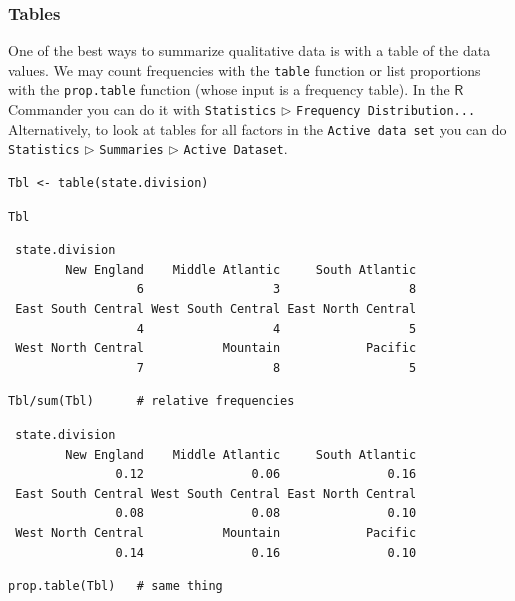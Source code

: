 \documentclass[captions=tableheading]{scrbook}
\begin{document}
\subsubsection{Tables}
\label{sec-3-1-4-1}
\label{par:Tables}


One of the best ways to summarize qualitative data is with a table of the data values. We may count frequencies with the \texttt{table} function or list proportions with the \texttt{prop.table} function (whose input is a frequency table). In the \(\mathsf{R}\) Commander you can do it with \texttt{Statistics} \(\triangleright\) \texttt{Frequency Distribution...} Alternatively, to look at tables for all factors in the \texttt{Active data set} you can do \texttt{Statistics} \(\triangleright\) \texttt{Summaries} \(\triangleright\) \texttt{Active Dataset}.


\begin{verbatim}
Tbl <- table(state.division)
\end{verbatim}


\begin{verbatim}
Tbl
\end{verbatim}

\begin{verbatim}
 state.division
        New England    Middle Atlantic     South Atlantic 
                  6                  3                  8 
 East South Central West South Central East North Central 
                  4                  4                  5 
 West North Central           Mountain            Pacific 
                  7                  8                  5
\end{verbatim}


\begin{verbatim}
Tbl/sum(Tbl)      # relative frequencies
\end{verbatim}

\begin{verbatim}
 state.division
        New England    Middle Atlantic     South Atlantic 
               0.12               0.06               0.16 
 East South Central West South Central East North Central 
               0.08               0.08               0.10 
 West North Central           Mountain            Pacific 
               0.14               0.16               0.10
\end{verbatim}


\begin{verbatim}
prop.table(Tbl)   # same thing
\end{verbatim}
\end{document}
